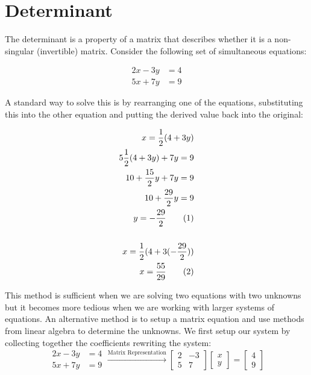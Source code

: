 \documentclass[a4paper,12pt]{book}
\newcommand{\nexteq}{\refstepcounter{equation}\theequation}
\begin{document}
	\section{Determinant}
	The determinant is a property of a matrix that describes whether it is a non-singular (invertible) matrix. Consider the following set of simultaneous equations: 
	
	\begin{align}
		2x - 3y &= 4 \\
		5x + 7y &= 9
	\end{align}
	
	A standard way to solve this is by rearranging one of the equations, substituting this into the other equation and putting the derived value back into the original:
	
	\begin{align*}
		x = \frac{1}{2} (4 + 3y) \\
		5\frac{1}{2}(4 + 3y) + 7y = 9 \\
		10 + \frac{15}{2} y + 7y = 9 \\
		10 + \frac{29}{2} y = 9 \\
		y = - \frac{29}{2} \tag{\nexteq} \\ 
		\\
		x = \frac{1}{2}(4 + 3(- \frac{29}{2})) \\
		x = \frac{55}{29} \tag{\nexteq}
	\end{align*}

	This method is sufficient when we are solving two equations with two unknowns but it becomes more tedious when we are working with larger systems of equations. An alternative method is to setup a matrix equation and use methods from linear algebra to determine the unknowns. We first setup our system by collecting together the coefficients rewriting the system: 
	\begin{equation}
		\begin{aligned}
			2x - 3y &= 4 \\
			5x + 7y &= 9
		\end{aligned}
		\xrightarrow{\text{Matrix Representation}}
		\begin{bmatrix}
			2 & -3 \\
			5 & 7 
		\end{bmatrix}
		\begin{bmatrix}
			x \\
			y
		\end{bmatrix}
		=
		\begin{bmatrix}
			4 \\
			9
		\end{bmatrix}
	\end{equation}
	
\end{document}
